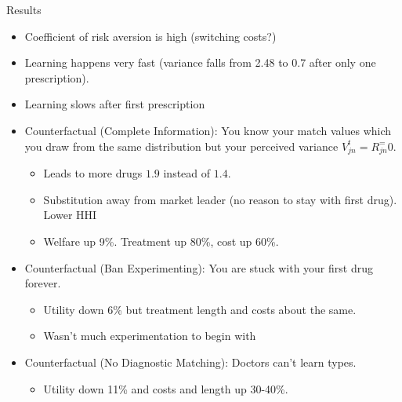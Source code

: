 \documentclass[aspectratio=169,11pt]{beamer}
\begin{document}
\begin{frame}{Results}
\begin{itemize}
\item Coefficient of risk aversion is high (switching costs?)
\item Learning happens very fast (variance falls from 2.48 to 0.7 after only \alert{one prescription}).
\item Learning slows after first prescription
\item Counterfactual (Complete Information): You know your match values which you draw from the same distribution but your perceived variance $V_{jn}^t = R_{jn}^=0$.
\begin{itemize}
\item Leads to more drugs $1.9$ instead of $1.4$.
\item Substitution away from market leader (no reason to stay with first drug). Lower HHI
\item Welfare up 9\%. Treatment up 80\%, cost up 60\%.
\end{itemize}
\item Counterfactual (Ban Experimenting): You are stuck with your first drug forever.
\begin{itemize}
\item Utility down 6\% but treatment length and costs about the same.
\item Wasn't much experimentation to begin with
\end{itemize}
\item Counterfactual (No Diagnostic Matching): Doctors can't learn types.
\begin{itemize}
\item Utility down 11\% and costs and length up 30-40\%.
\end{itemize}
\end{itemize}
\end{frame}






\end{document}
